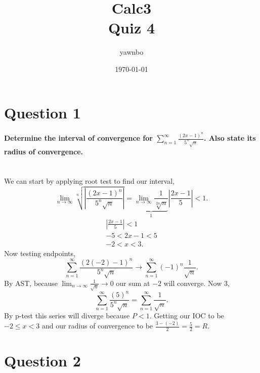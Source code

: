 \documentclass{report}
\title{\Huge{Calc3}\\ Quiz 4 }
\author{\huge{yawnbo}}
\date{\today}
\begin{document}
\maketitle
\newpage%

\pagebreak

\section*{Question 1}%
\label{sec:Question 1}
\paragraph{Determine the interval of convergence for $ \sum_{ n=1 } ^{ \infty } \frac{ \left( 2x-1 \right) ^{ n } }{ 5^{ n }\sqrt{ n} } $. Also state its radius of convergence. \\ \\}
We can start by applying root test to find our interval,
\[
\lim_{ n \to \infty} \sqrt[ n ]{ \left| \frac{ \left( 2x-1 \right) ^{ n } }{ 5^{ n }\sqrt{ n} } \right| } = \underbrace{ \lim_{ n \to \infty} \frac{ 1 }{ \sqrt[ 2n ]{ n }  } }_{ 1 }  \left| \frac{ 2x-1 }{ 5 } \right|<1
.\] 
\begin{gather*}
	 \left| \frac{ 2x-1 }{ 5 } \right|<1 \\
	-5 < 2x-1 < 5 \\
	-2 < x < 3
.\end{gather*}
Now testing endpoints,
\[
\sum_{ n=1 } ^{ \infty } \frac{ \left( 2\left( -2 \right) -1 \right) ^{ n } }{ 5^{ n }\sqrt{ n} } \to \sum_{ n=1 } ^{ \infty } \left( -1 \right) ^{ n }\frac{ 1 }{ \sqrt{ n } }
.\] 
By AST, because $ \lim_{ n \to \infty} \frac{ 1 }{ \sqrt{ n }  } \to 0 $ our sum at $ -2 $ will converge. Now 3,
\[
\sum_{ n=1 } ^{ \infty } \frac{ \left( 5 \right) ^{ n } }{ 5^{ n }\sqrt{ n }  } = \sum_{ n=1 } ^{ \infty } \frac{ 1 }{ \sqrt{ n }  } 
.\] 
By p-test this series will diverge because $ P<1 $. Getting our IOC to be $ -2\le x < 3 $ and our radius of convergence to be $ \frac{ 3-\left( -2 \right)  }{ 2 }= \frac{ 5 }{ 2 } =R $. 

\section*{Question 2}%
\label{sec:Question 2}
\end{document}
